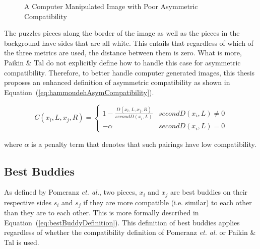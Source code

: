 \documentclass{report}
\def\eref#1{(\ref{#1})}
\begin{document}
\begin{figure}
\centering
{}
\caption{A Computer Manipulated Image with Poor Asymmetric Compatibility}
\label{fig:objectWhiteBackground}
\end{figure}

The puzzles pieces along the border of the image as well as the pieces in the background have sides that are all white.  This entails that regardless of which of the three metrics are used, the distance between them is zero.  What is more, Paikin \& Tal do not explicitly define how to handle this case for asymmetric compatibility.  Therefore, to better handle computer generated images, this thesis proposes an enhanced definition of asymmetric compatibility as shown in Equation~\eref{eq:hammoudehAsymCompatibility}.  

\begin{equation} \label{eq:hammoudehAsymCompatibility}
C(x_i,L,x_j,R)= \begin{cases} 
	1 - \frac{D(x_i,L,x_j,R)}{secondD(x_i,L)} & secondD(x_i,L) \ne 0
\\
	-\alpha & secondD(x_i,L) = 0
\end{cases} 
\end{equation}

\noindent
where $\alpha$ is a penalty term that denotes that such pairings have low compatibility.


\subsection{Best Buddies}\label{sec:bestBuddies}

As defined by Pomeranz \textit{et. al.}, two pieces, $x_i$ and $x_j$ are best buddies on their respective sides $s_i$ and $s_j$ if they are more compatible (i.e. similar) to each other than they are to each other.  This is more formally described in Equation~\eref{eq:bestBuddyDefinition}.  This definition of best buddies applies regardless of whether the compatibility definition of Pomeranz \textit{et. al.} or Paikin \& Tal is used.
\end{document}
